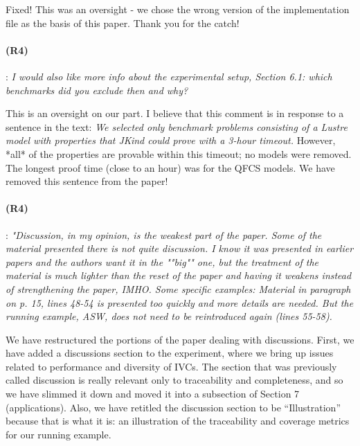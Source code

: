 \documentclass{article}
\begin{document}
Fixed!  This was an oversight - we chose the wrong version of the implementation file as the basis of this paper.  Thank you for the catch!

\paragraph{(R4)}: \textit{I would also like more info about the experimental setup, Section 6.1: which benchmarks did you exclude then and why?}
\vspace{0.05in}

This is an oversight on our part.  I believe that this comment is in response to a sentence in the text: \textit{We selected only benchmark problems consisting of a Lustre model with properties that JKind could prove with a 3-hour timeout.}  However, *all* of the properties are provable within this timeout; no models were removed.  The longest proof time (close to an hour) was for the QFCS models.  We have removed this sentence from the paper!


\paragraph{(R4)}: \textit{"Discussion, in my opinion, is the weakest part of the paper. Some of the material presented there is not quite discussion. I know it was presented in earlier papers and the authors want it in the ""big"" one, but the treatment of the material is much lighter than the reset of the paper and having it weakens instead of strengthening the paper, IMHO. Some specific examples: Material in paragraph on p. 15, lines 48-54 is presented too quickly and more details are needed.  But the running example, ASW, does not need to be reintroduced again (lines 55-58).}
\vspace{0.05in}


We have restructured the portions of the paper dealing with discussions.  First, we have added a discussions section to the experiment, where we bring up issues related to performance and diversity of IVCs.  The section that was previously called discussion is really relevant only to traceability and completeness, and so we have slimmed it down and moved it into a subsection of Section 7 (applications).  Also, we have retitled the discussion section to be ``Illustration'' because that is what it is: an illustration of the traceability and coverage metrics for our running example.
\end{document}
